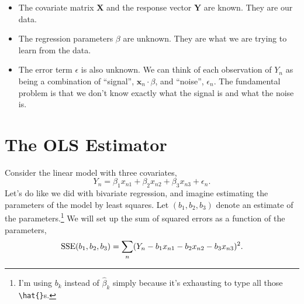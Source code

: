 \documentclass[12pt,oneside,openany]{book}
\let\rmarkdownfootnote\footnote%
\def\footnote{\protect\rmarkdownfootnote}
\begin{document}
\begin{itemize}
\item
  The covariate matrix \(\mathbf{X}\) and the response vector
  \(\mathbf{Y}\) are known. They are our data.
\item
  The regression parameters \(\beta\) are unknown. They are what we are
  trying to learn from the data.
\item
  The error term \(\epsilon\) is also unknown. We can think of each
  observation of \(Y_n\) as being a combination of ``signal'',
  \(\mathbf{x}_n \cdot \beta\), and ``noise'', \(\epsilon_n\). The
  fundamental problem is that we don't know exactly what the signal is
  and what the noise is.
\end{itemize}

\section{The OLS Estimator}\label{the-ols-estimator}

Consider the linear model with three covariates, \[
Y_n = \beta_1 x_{n1} + \beta_2 x_{n2} + \beta_3 x_{n3} + \epsilon_n.
\] Let's do like we did with bivariate regression, and imagine
estimating the parameters of the model by least squares. Let
\((b_1, b_2, b_3)\) denote an estimate of the parameters.\footnote{I'm
  using \(b_k\) instead of \(\hat{\beta}_k\) simply because it's
  exhausting to type all those \texttt{\textbackslash{}hat\{\}}s.} We
will set up the sum of squared errors as a function of the parameters,
\[
\mathop{\rm SSE}\nolimits(b_1, b_2, b_3)
= \sum_n (Y_n - b_1 x_{n1} - b_2 x_{n2} - b_3 x_{n3})^2.
\]
\end{document}
